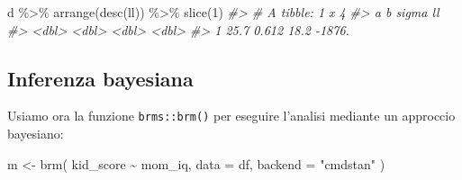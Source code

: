 \documentclass[
  10pt,
  italian,
  a4paper,
  extrafontsizes,onecolumn,openright
  ]{memoir}
\newenvironment{Shaded}{\begin{snugshade}}{\end{snugshade}}
\newcommand{\AttributeTok}[1]{\textcolor[rgb]{0.77,0.63,0.00}{#1}}
\newcommand{\CommentTok}[1]{\textcolor[rgb]{0.56,0.35,0.01}{\textit{#1}}}
\newcommand{\DecValTok}[1]{\textcolor[rgb]{0.00,0.00,0.81}{#1}}
\newcommand{\FunctionTok}[1]{\textcolor[rgb]{0.00,0.00,0.00}{#1}}
\newcommand{\NormalTok}[1]{#1}
\newcommand{\OtherTok}[1]{\textcolor[rgb]{0.56,0.35,0.01}{#1}}
\newcommand{\SpecialCharTok}[1]{\textcolor[rgb]{0.00,0.00,0.00}{#1}}
\newcommand{\StringTok}[1]{\textcolor[rgb]{0.31,0.60,0.02}{#1}}
\begin{document}
\begin{Shaded}
\begin{Highlighting}[]
\NormalTok{d }\SpecialCharTok{\%\textgreater{}\%} 
  \FunctionTok{arrange}\NormalTok{(}\FunctionTok{desc}\NormalTok{(ll)) }\SpecialCharTok{\%\textgreater{}\%} 
  \FunctionTok{slice}\NormalTok{(}\DecValTok{1}\NormalTok{)}
\CommentTok{\#\textgreater{} \# A tibble: 1 x 4}
\CommentTok{\#\textgreater{}       a     b sigma     ll}
\CommentTok{\#\textgreater{}   \textless{}dbl\textgreater{} \textless{}dbl\textgreater{} \textless{}dbl\textgreater{}  \textless{}dbl\textgreater{}}
\CommentTok{\#\textgreater{} 1  25.7 0.612  18.2 {-}1876.}
\end{Highlighting}
\end{Shaded}

\hypertarget{inferenza-bayesiana}{%
\subsection{Inferenza bayesiana}\label{inferenza-bayesiana}}

Usiamo ora la funzione \texttt{brms::brm()} per eseguire l'analisi mediante un approccio bayesiano:

\begin{Shaded}
\begin{Highlighting}[]
\NormalTok{m }\OtherTok{\textless{}{-}}
  \FunctionTok{brm}\NormalTok{(}
\NormalTok{    kid\_score }\SpecialCharTok{\textasciitilde{}}\NormalTok{ mom\_iq,}
    \AttributeTok{data =}\NormalTok{ df, }
    \AttributeTok{backend =} \StringTok{"cmdstan"}
\NormalTok{  )}
\end{Highlighting}
\end{Shaded}
\end{document}
